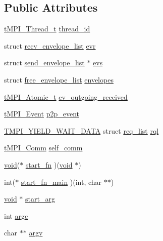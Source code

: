 \subsection*{\-Public \-Attributes}
\begin{DoxyCompactItemize}
\item 
\hyperlink{include_2thread__mpi_2threads_8h_a6051cb02dd9c9356fee11e4be80adbf8}{t\-M\-P\-I\-\_\-\-Thread\-\_\-t} \hyperlink{structtmpi__thread_ab76767898f5c6bc4a0a2c225d34e8b59}{thread\-\_\-id}
\item 
struct \hyperlink{structrecv__envelope__list}{recv\-\_\-envelope\-\_\-list} \hyperlink{structtmpi__thread_ab48603884206cf84d6265100e0f6822b}{evr}
\item 
struct \hyperlink{structsend__envelope__list}{send\-\_\-envelope\-\_\-list} $\ast$ \hyperlink{structtmpi__thread_a138b117af6f6678ac5dc7c90c6a35ab0}{evs}
\item 
struct \hyperlink{structfree__envelope__list}{free\-\_\-envelope\-\_\-list} \hyperlink{structtmpi__thread_afffaf584fa465917dc02bc46723aff4f}{envelopes}
\item 
\hyperlink{include_2thread__mpi_2atomic_2gcc_8h_a2c33794dc540e3b07cffc1f81a3fe4b4}{t\-M\-P\-I\-\_\-\-Atomic\-\_\-t} \hyperlink{structtmpi__thread_ab98bab078a79355851cadcf9a64479a1}{ev\-\_\-outgoing\-\_\-received}
\item 
\hyperlink{include_2thread__mpi_2event_8h_a1e973c2d3372299b4635d2bbdd92b549}{t\-M\-P\-I\-\_\-\-Event} \hyperlink{structtmpi__thread_adadda09bdf6cfd55cc25a93b7e9601fe}{p2p\-\_\-event}
\item 
\hyperlink{share_2template_2gromacs_2thread__mpi_2wait_8h_a8eb646ceca7c3b036933e55742078ddb}{\-T\-M\-P\-I\-\_\-\-Y\-I\-E\-L\-D\-\_\-\-W\-A\-I\-T\-\_\-\-D\-A\-T\-A} struct \*
\hyperlink{structreq__list}{req\-\_\-list} \hyperlink{structtmpi__thread_ac36fd3e35e6ec0c973b316f16699bde4}{rql}
\item 
\hyperlink{include_2thread__mpi_2tmpi_8h_ab76dc275b882a1d00a54353fb8dd4cb3}{t\-M\-P\-I\-\_\-\-Comm} \hyperlink{structtmpi__thread_a2e92372374bd15fa6cf3756cfb4683eb}{self\-\_\-comm}
\item 
\hyperlink{nbnxn__kernel__simd__4xn__outer_8h_a8dc3f4a797ed992dff49d2fa3477eee8}{void}($\ast$ \hyperlink{structtmpi__thread_a45e547b636ede3504c7db19ac15b5af4}{start\-\_\-fn} )(\hyperlink{nbnxn__kernel__simd__4xn__outer_8h_a8dc3f4a797ed992dff49d2fa3477eee8}{void} $\ast$)
\item 
int($\ast$ \hyperlink{structtmpi__thread_af76717bbc4841165b36774987bc588a0}{start\-\_\-fn\-\_\-main} )(int, char $\ast$$\ast$)
\item 
\hyperlink{nbnxn__kernel__simd__4xn__outer_8h_a8dc3f4a797ed992dff49d2fa3477eee8}{void} $\ast$ \hyperlink{structtmpi__thread_a6a569295b7ed821034c94c3e3f0cbca3}{start\-\_\-arg}
\item 
int \hyperlink{structtmpi__thread_a709aa70ca12a0f49054424116a185669}{argc}
\item 
char $\ast$$\ast$ \hyperlink{structtmpi__thread_abf299d49227ccbe38b07fbea42ee9920}{argv}
\end{DoxyCompactItemize}


